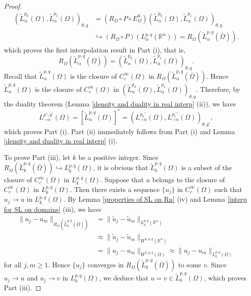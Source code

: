 \documentclass[reqno,centertags,11pt]{amsart}
\theoremstyle{definition}
\numberwithin{thm}{section}
\numberwithin{equation}{section}
\newcommand{\R}{{\mathbb{R}}}
\begin{document}
\begin{proof}
$$
\begin{aligned}
 \left( \widetilde{L}_\alpha^{p_0}(\Omega )  ,\widetilde{L}_\alpha^{p_1}(\Omega ) \right)_{\theta,q}
&= \left( R_\Omega \circ P \circ E^0_\Omega \right) \left( \widetilde{L}_\alpha^{p_0}(\Omega )  ,\widetilde{L}_\alpha^{p_1}(\Omega ) \right)_{\theta,q} \\
& \hookrightarrow  ( R_\Omega \circ P) (  L_\alpha^{p,q }(\R^n) ) = R_\Omega  (\widetilde{L}_\alpha^{p,q} (\overline{\Omega} ) ).
\end{aligned}
$$
which proves the first interpolation result in Part (i), that is,  
\[
R_\Omega  (\widetilde{L}_\alpha^{p,q} (\overline{\Omega} ) )  = \left( \widetilde{L}_\alpha^{p_0}(\Omega ) ,\widetilde{L}_\alpha^{p_1}(\Omega ) \right)_{\theta,q}.
\]
Recall  that   $\widetilde{L}_\alpha^{p,q}(\Omega )$ is  the closure of $C_c^\infty (\Omega  )$ in $R_\Omega  (\widetilde{L}_\alpha^{p,q} (\overline{\Omega} )  )$. Hence  $\widetilde{L}_\alpha^{p,q}(\Omega )$ is  the closure of $C_c^\infty (\Omega  )$ in $\left( \widetilde{L}_\alpha^{p_0}(\Omega ) ,\widetilde{L}_\alpha^{p_1}(\Omega ) \right)_{\theta,q}$. Therefore, by the duality theorem (Lemma \ref{density and duality in real interp} (ii)), we have
\[%
L_{-\alpha}^{p',q'} (\Omega )   = \left[\widetilde{L}_\alpha^{p,q}(\Omega )\right]^* =  \left( L_{-\alpha}^{p_0 '} (\Omega ) ,L_{-\alpha}^{p_1 '} (\Omega ) \right)_{\theta,q'},
\]%
which proves Part (i).   Part (ii) immediately follows from Part (i) and Lemma \ref{density and duality in real interp} (i).

To prove Part (iii), let $k$ be a positive integer. Since $R_\Omega  (\widetilde{L}_k^{p,q} (\overline{\Omega} ) ) \hookrightarrow L_k^{p,q}(\Omega )$, it is obvious that $\widetilde{L}_k^{p,q}(\Omega ) $ is a subset of  the closure of $C_c^\infty (\Omega) $ in $L_k^{p,q}(\Omega )$.
Suppose that $u$ belongs to  the closure of $C_c^\infty (\Omega) $ in $L_k^{p,q}(\Omega )$. Then there exists a sequence $\{u_j\}$ in $C_c^\infty (\Omega )$ such that $u_j \to u$ in $L_k^{p,q}(\Omega )$.
By Lemma \ref{properties of SL on Rn} (iv) and Lemma \ref{interp for SL on domains} (iii), we have
\begin{align*}
\| u_j -u_m  \|_{R_\Omega  (\widetilde{L}_k^{p,q} (\overline{\Omega} )  )}  &=  \|\widetilde{u}_j - \widetilde{u}_m \|_{L_k^{p,q}(\R^n )} \\
 & \approx  \|\widetilde{u}_j - \widetilde{u}_m  \|_{W^{k, p,q}(\R^n )} \\
 &= \| {u}_j -u_m  \|_{W^{k, p,q}(\Omega )}\approx \| {u}_j -u_m  \|_{L_k^{p,q}(\Omega )}
\end{align*}
for all $j,m \ge 1$. Hence  $ \{u_j\} $ converges in $R_\Omega  (\widetilde{L}_k^{p,q} (\overline{\Omega} )  )$ to some $v$. Since  $ u_j \to u $ and $u_j \to v$  in $L_k^{p,q}(\Omega )$, we deduce that
$u = v \in \widetilde{L}_k^{p,q}(\Omega )$, which proves Part (iii).



\end{proof}
\end{document}
